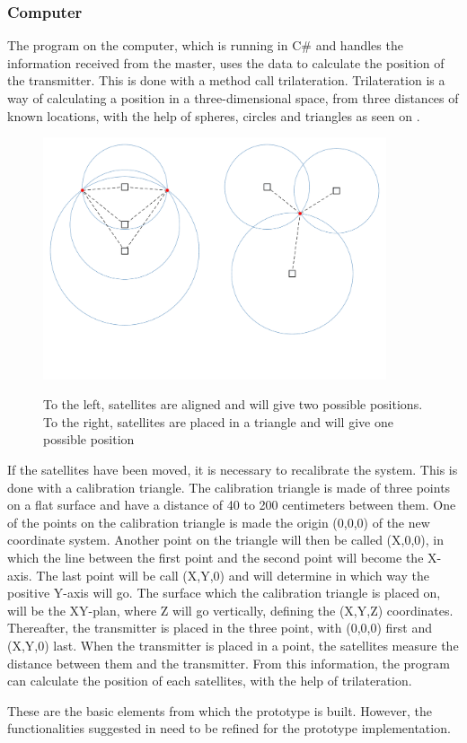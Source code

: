 \subsubsection{Computer}
The program on the computer, which is running in C\# and handles the information received from the master, uses the data to calculate the position of the transmitter. This is done with a method call trilateration. Trilateration is a way of calculating a position in a three-dimensional space, from three distances of known locations, with the help of spheres, circles and triangles as seen on .
%
\begin{figure}[H]
  \centering
  {
    \includegraphics[width=0.9\textwidth]{figures/GoT_SingleVsTriangle.pdf}
  }
  \caption{To the left, satellites are aligned and will give two possible positions. To the right, satellites are placed in a triangle and will give one possible position}
  \label{GoTTriVSLine}
\end{figure}
%
If the satellites have been moved, it is necessary to recalibrate the system. This is done with a calibration triangle. The calibration triangle is made of three points on a flat surface and have a distance of 40 to 200 centimeters between them. One of the points on the calibration triangle is made the origin (0,0,0) of the new coordinate system. Another point on the triangle will then be called (X,0,0), in which the line between the first point and the second point will become the X-axis. The last point will be call (X,Y,0) and will determine in which way the positive Y-axis will go. The surface which the calibration triangle is placed on, will be the XY-plan, where Z will go vertically, defining the (X,Y,Z) coordinates. Thereafter, the transmitter is placed in the three point, with (0,0,0) first and (X,Y,0) last. When the transmitter is placed in a point, the satellites measure the distance between them and the transmitter. From this information, the program can calculate the position of each satellites, with the help of trilateration.

These are the basic elements from which the prototype is built. However, the functionalities suggested in  need to be refined for the prototype implementation.